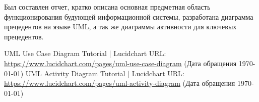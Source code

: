 \documentclass[14pt]{extreport}
\begin{document}
\conclusions

Был составлен отчет, кратко описана основная предметная область функционирования будующей информационной системы, разработана диаграмма прецедентов на языке UML, а так же диаграммы активности для ключевых прецедентов.

\newpage
\begin{thebibliography}{99}
	 	UML Use Case Diagram Tutorial | Lucidchart URL: \url{https://www.lucidchart.com/pages/uml-use-case-diagram} (Дата обращения \today)
     	UML Activity Diagram Tutorial | Lucidchart URL: \url{https://www.lucidchart.com/pages/uml-activity-diagram} (Дата обращения \today)
\end{thebibliography}
\end{document}
